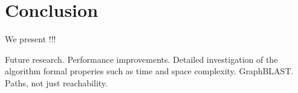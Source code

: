 \section{Conclusion}

We present !!!


Future research.
Performance improvements.
Detailed investigation of the algorithm formal properies such as time and space complexity.
GraphBLAST.
Paths, not just reachability.

